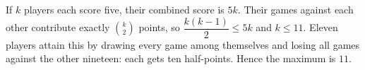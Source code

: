 If $k$ players each score five, their combined score is $5k$. Their games against each other contribute exactly $\binom k2$ points, so $\dfrac{k(k-1)}{2}\le5k$ and $k\le11$. Eleven players attain this by drawing every game among themselves and losing all games against the other nineteen: each gets ten half-points. Hence the maximum is $\boxed{11}$.

